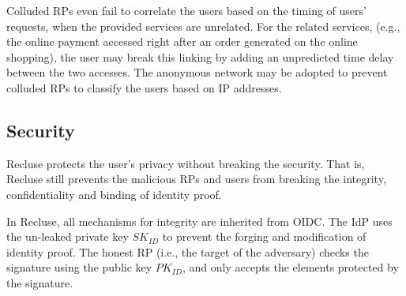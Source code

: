 \begin{itemize}

\end{itemize}

Colluded RPs even fail to correlate the users based on the timing of users' requests, when the provided services are unrelated. For the related services, (e.g., the online payment accessed right after an order generated on the online shopping), the user may break this linking by adding an unpredicted time delay between the two accesses. The anonymous network may be adopted to prevent colluded RPs to classify the users based on IP addresses.

\begin{comment}
\begin{itemize}
  \item A \textbf{curious} RP fails to infer the user's unique identifier (i.e., UID) through $PUID$.
   \item A \textbf{colluded curious} RP fails to link a user between RPs.
  \item A \textbf{malicious} RP fails to make the UID leaked.
  \item The \textbf{colluded malicious RPs} fail to (actively) make the UID leaked.
  \item The \textbf{colluded malicious RPs} fail to actively trigger the generation of a same PPID or derivable PPIDs.
  \item The \textbf{colluded malicious RPs} fail to passively link a user between RPs.
\end{itemize}
\end{comment}

\subsection{Security}
\label{subsec:security}
Recluse protects the user's privacy without breaking the security. That is, Recluse still prevents the malicious RPs and users from breaking the integrity, confidentiality and binding of identity proof.

In Recluse, all mechanisms for integrity are inherited from OIDC. The IdP uses the un-leaked private key $SK_{ID}$ to prevent the forging and modification of identity proof. The honest RP (i.e., the target of the adversary) checks the signature using the public key $PK_{ID}$, and only accepts the elements protected by the signature.

